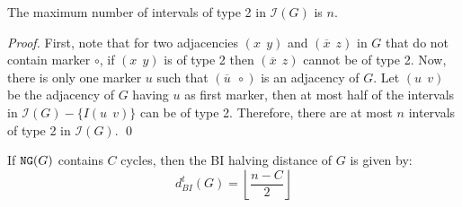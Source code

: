 \documentclass{llncs}
\newcommand{\fst}[1]{ \ensuremath{#1} }
\newcommand{\snd}[1]{ \ensuremath{\overline{#1}} }
\newcommand\aff[2]{\ensuremath{(\fst{#1}~~\fst{#2})}}
\newcommand\asf[2]{\ensuremath{(\snd{#1}~~\fst{#2})}}
\renewcommand{\NG}{\ensuremath{\mbox{\texttt{NG}}}}
\begin{document}
\begin{lemma}
The maximum number of intervals of type 2 in  $\mathcal{I}(G)$ is $n$.
\label{maxType2}
\end{lemma}

\begin{proof}
First, note that for two adjacencies $\aff{x}{y}$ and $\asf{x}{z}$ in $G$ that 
do not contain marker $\circ$, if $\aff{x}{y}$ is of type 2 then $\asf{x}{z}$ 
cannot be of type 2.
Now, there is only one marker $u$ such that  $\asf{u}{\circ}$ is an adjacency 
of $G$. Let $\aff{u}{v}$ be the adjacency of $G$ having $u$ as first marker, 
then at most half of the intervals in $\mathcal{I}(G) - \{I\aff{u}{v}\}$ can 
be of type 2.
Therefore, there are at most $n$ intervals of type 2 in $\mathcal{I}(G)$.   \qed








\end{proof}


\begin{theorem}
If $\NG(G)$ contains $C$ cycles, then the BI halving distance of $G$
    is given by: 
$$d^t_{BI}(G) =  \left \lfloor \frac{n - C}{2} \right \rfloor$$
\label{th:distance}
\end{theorem}
\end{document}
